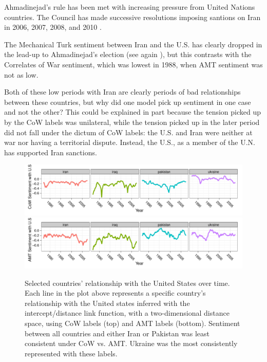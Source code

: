 \begin{itemize}
    Ahmadinejad's rule has been met with increasing pressure from
    United Nations countries.  The Council has made successive
    resolutions imposing santions on Iran in 2006, 2007, 2008, and
    2010 \cite{iranstate:2012}.

    The Mechanical Turk sentiment between Iran and the U.S. has
    clearly dropped in the lead-up to Ahmadinejad's election (see
    again ), but this contrasts
    with the Correlates of War sentiment, which was lowest in 1988,
    when AMT sentiment was not as low.

\end{itemize}
 
Both of these low periods with Iran are clearly periods of bad
relationships between these countries, but why did one model pick up
sentiment in one case and not the other?  This could be explained in
part because the tension picked up by the CoW labels was unilateral,
while the tension picked up in the later period did not fall under the
dictum of CoW labels: the U.S. and Iran were neither at war nor having
a territorial dispute.  Instead, the U.S., as a member of the U.N. has
supported Iran sanctions.


\begin{figure}
  \center
    \includegraphics[width=1\textwidth]{chapter_foreign_relations/figures/012_fr_cow_mutual_sentiment_with_us.pdf}
    \includegraphics[width=1\textwidth]{chapter_foreign_relations/figures/012_fr_mturk_mutual_sentiment_with_us.pdf}
  \label{fig:country_positions_over_time}
  \caption{Selected countries' relationship with the United States
    over time.  Each line in the plot above represents a specific
    country's relationship with the United states inferred with the
    intercept/distance link function, with a two-dimensional distance
    space, using CoW labels (top) and AMT labels (bottom).  Sentiment
    between all countries and either Iran or Pakistan was
    least consistent under CoW vs. AMT. Ukraine was
    the most consistently represented with these labels.}
\end{figure}

